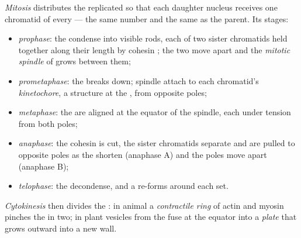 \begin{definition}[Mitosis]\label{def:b1:replication-mitosis:mitosis}
\emph{Mitosis} distributes the replicated  so that each
daughter nucleus receives one chromatid of every  --- the
same number and the same  as the parent. Its stages:
\begin{itemize}
  \item \emph{prophase}: the  condense into visible rods,
        each of two sister chromatids held together along their length
        by cohesin ; the two \emph{} move apart and
        the \emph{mitotic spindle} of  grows between them;
  \item \emph{prometaphase}: the  breaks down;
        spindle  attach to each chromatid's
        \emph{kinetochore}, a  structure at the , from
        opposite poles;
  \item \emph{metaphase}: the  are aligned at the equator
        of the spindle, each under tension from both poles;
  \item \emph{anaphase}: the cohesin is cut, the sister chromatids
        separate and are pulled to opposite poles as the 
        shorten (anaphase A) and the poles move apart (anaphase B);
  \item \emph{telophase}: the  decondense, and a  re-forms around each set.
\end{itemize}
\emph{Cytokinesis} then divides the : in animal  a
\emph{contractile ring} of actin and myosin pinches the  in two;
in plant  vesicles from the  fuse at the equator into a
\emph{ plate} that grows outward into a new wall.
\end{definition}

